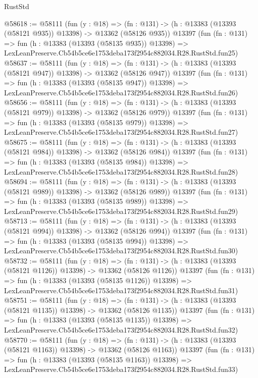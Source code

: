 \begin{lexlean}{RustStd}
\begin{coremodule}
@58618 := @58111
    (fun (y : @18) =>
    (fn : @131) -> (h : @13383 (@13393 (@58121 @935)) @13398) -> @13362 (@58126 @935))
    @13397
    (fun (fn : @131) =>
    fun (h : @13383 (@13393 (@58135 @935)) @13398) =>
    LexLeanPreserve.Cb54b5ce6e1753deba173f2954c882034.R28.RustStd.fun25)
@58637 := @58111
    (fun (y : @18) =>
    (fn : @131) -> (h : @13383 (@13393 (@58121 @947)) @13398) -> @13362 (@58126 @947))
    @13397
    (fun (fn : @131) =>
    fun (h : @13383 (@13393 (@58135 @947)) @13398) =>
    LexLeanPreserve.Cb54b5ce6e1753deba173f2954c882034.R28.RustStd.fun26)
@58656 := @58111
    (fun (y : @18) =>
    (fn : @131) -> (h : @13383 (@13393 (@58121 @979)) @13398) -> @13362 (@58126 @979))
    @13397
    (fun (fn : @131) =>
    fun (h : @13383 (@13393 (@58135 @979)) @13398) =>
    LexLeanPreserve.Cb54b5ce6e1753deba173f2954c882034.R28.RustStd.fun27)
@58675 := @58111
    (fun (y : @18) =>
    (fn : @131) -> (h : @13383 (@13393 (@58121 @984)) @13398) -> @13362 (@58126 @984))
    @13397
    (fun (fn : @131) =>
    fun (h : @13383 (@13393 (@58135 @984)) @13398) =>
    LexLeanPreserve.Cb54b5ce6e1753deba173f2954c882034.R28.RustStd.fun28)
@58694 := @58111
    (fun (y : @18) =>
    (fn : @131) -> (h : @13383 (@13393 (@58121 @989)) @13398) -> @13362 (@58126 @989))
    @13397
    (fun (fn : @131) =>
    fun (h : @13383 (@13393 (@58135 @989)) @13398) =>
    LexLeanPreserve.Cb54b5ce6e1753deba173f2954c882034.R28.RustStd.fun29)
@58713 := @58111
    (fun (y : @18) =>
    (fn : @131) -> (h : @13383 (@13393 (@58121 @994)) @13398) -> @13362 (@58126 @994))
    @13397
    (fun (fn : @131) =>
    fun (h : @13383 (@13393 (@58135 @994)) @13398) =>
    LexLeanPreserve.Cb54b5ce6e1753deba173f2954c882034.R28.RustStd.fun30)
@58732 := @58111
    (fun (y : @18) =>
    (fn : @131) -> (h : @13383 (@13393 (@58121 @1126)) @13398) -> @13362 (@58126 @1126))
    @13397
    (fun (fn : @131) =>
    fun (h : @13383 (@13393 (@58135 @1126)) @13398) =>
    LexLeanPreserve.Cb54b5ce6e1753deba173f2954c882034.R28.RustStd.fun31)
@58751 := @58111
    (fun (y : @18) =>
    (fn : @131) -> (h : @13383 (@13393 (@58121 @1135)) @13398) -> @13362 (@58126 @1135))
    @13397
    (fun (fn : @131) =>
    fun (h : @13383 (@13393 (@58135 @1135)) @13398) =>
    LexLeanPreserve.Cb54b5ce6e1753deba173f2954c882034.R28.RustStd.fun32)
@58770 := @58111
    (fun (y : @18) =>
    (fn : @131) -> (h : @13383 (@13393 (@58121 @1163)) @13398) -> @13362 (@58126 @1163))
    @13397
    (fun (fn : @131) =>
    fun (h : @13383 (@13393 (@58135 @1163)) @13398) =>
    LexLeanPreserve.Cb54b5ce6e1753deba173f2954c882034.R28.RustStd.fun33)

\end{coremodule}
\end{lexlean}
